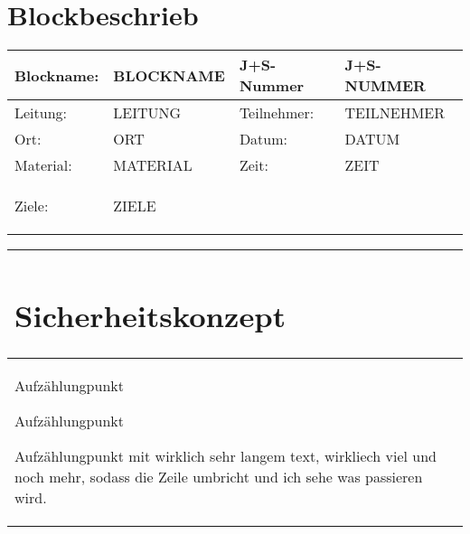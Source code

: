 \documentclass[12pt]{article}
\newcommand{\tstamp}{DATUM}
\begin{document}
\section*{Blockbeschrieb}
	\begin{tabular}{|p{2.5cm}|p{5.5cm}|p{2.5cm}|p{5.5cm}|}
	\hline
	Blockname: 	& BLOCKNAME	& J+S-Nummer	& J+S-NUMMER \\ \hline
	Leitung:		& LEITUNG		& Teilnehmer:	& TEILNEHMER \\ \hline
	Ort:			& ORT			& Datum:		& \tstamp \\ \hline
	Material:		& MATERIAL		& Zeit:		& ZEIT \\ \hline
	Ziele:		&  \multicolumn{3}{p{13.5cm+4\tabcolsep+2\arrayrulewidth}|}{\begin{compactitem} %
		\item ZIELE %
 	\end{compactitem}} \\
	\hline
\end{tabular}



\begin{tabular}{|p{17.5cm+3\arrayrulewidth}|}
	\hline
	\parbox[0pt][1.5cm][c]{0cm}{\section*{Sicherheitskonzept}}\\
	\hline
	\begin{compactitem}
		 \item Aufz\"ahlungpunkt
		 \item Aufz\"ahlungpunkt
 		\item Aufz\"ahlungpunkt mit wirklich sehr langem text, wirkliech viel und noch mehr, sodass die Zeile umbricht und ich sehe was passieren wird.
 	\end{compactitem}\\
 	\hline 
\end{tabular}
\end{document}
